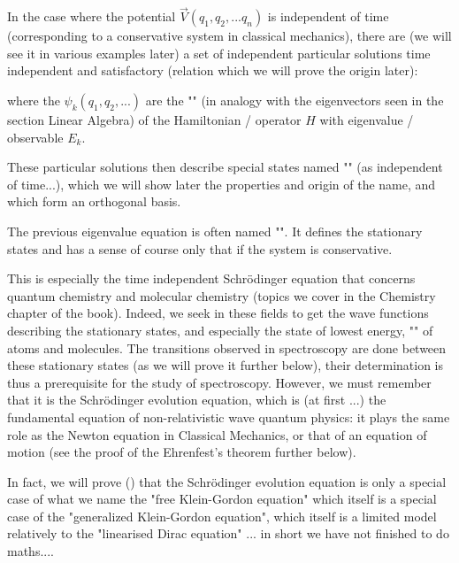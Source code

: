 	In the case where the potential $\vec{V}(q_1,q_2,...q_n)$ is independent of time (corresponding to a conservative system in classical mechanics), there are (we will see it in various  examples later) a set of independent particular solutions time independent and satisfactory (relation which we will prove the origin later):
	
	where the $\psi_k(q_1,q_2,...)$ are the "" (in analogy with the eigenvectors seen in the section Linear Algebra) of the Hamiltonian / operator $H$ with eigenvalue / observable $E_k$.
	
	These particular solutions then describe special states named "" (as independent of time...), which we will show later the properties and origin of the name, and which form an orthogonal basis.
	
	The previous eigenvalue equation is often named "". It defines the stationary states and has a sense of course only that if the system is conservative.
	
	This is especially the time independent Schrödinger equation that concerns quantum chemistry and molecular chemistry (topics we cover in the Chemistry chapter of the book). Indeed, we seek in these fields to get the wave functions describing the stationary states, and especially the state of lowest energy, "" of atoms and molecules. The transitions observed in spectroscopy are done between these stationary states (as we will prove it further below), their determination is thus a prerequisite for the study of spectroscopy. However, we must remember that it is the Schrödinger evolution equation, which is (at first ...) the fundamental equation of non-relativistic wave quantum physics: it plays the same role as the Newton equation in Classical Mechanics, or that of an equation of motion (see the proof of the  Ehrenfest's theorem further below).
	\begin{tcolorbox}[title=Remark,colframe=black,arc=10pt]
	In fact, we will prove () that the Schrödinger evolution equation is only a special case of what we name the "free Klein-Gordon equation" which itself is a special case of the "generalized Klein-Gordon equation", which itself is a limited model relatively to the "linearised Dirac equation" ... in short we have not finished to do maths....
	\end{tcolorbox}
	
